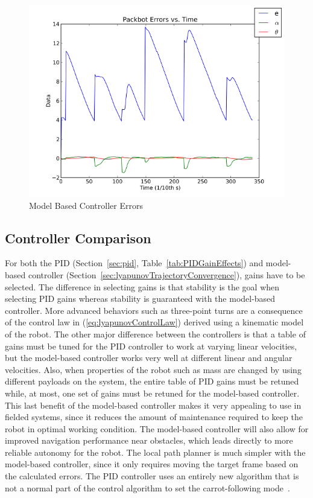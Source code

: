 \begin{figure}[ht!]
\centering
\includegraphics[width=.5\textwidth]{images/pbtx/20110113_1451_pbtx_simpleDriveErrors}
\caption{Model Based Controller Errors}%
\label{fig:mbErrors}
\end{figure}

\subsection{Controller Comparison}%
\label{sec:controllerComparison}
For both the PID (Section~\ref{sec:pid}, Table~\ref{tab:PIDGainEffects}) and model-based controller (Section~\ref{sec:lyapunovTrajectoryConvergence}), gains have to be selected.
The difference in selecting gains is that stability is the goal when selecting PID gains whereas stability is guaranteed with the model-based controller.
More advanced behaviors such as three-point turns are a consequence of the control law in (\ref{eq:lyapunovControlLaw}) derived using a kinematic model of the robot.
The other major difference between the controllers is that a table of gains must be tuned for the PID controller to work at varying linear velocities, but the model-based controller works very well at different linear and angular velocities.
Also, when properties of the robot such as mass are changed by using different payloads on the system, the entire table of PID gains must be retuned while, at most, one set of gains must be retuned for the model-based controller.
This last benefit of the model-based controller makes it very appealing to use in fielded systems, since it reduces the amount of maintenance required to keep the robot in optimal working condition.
The model-based controller will also allow for improved navigation performance near obstacles, which leads directly to more reliable autonomy for the robot.
The local path planner is much simpler with the model-based controller, since it only requires moving the target frame based on the calculated errors.
The PID controller uses an entirely new algorithm that is not a normal part of the control algorithm to set the carrot-following mode~\cite{Hogg02}.

